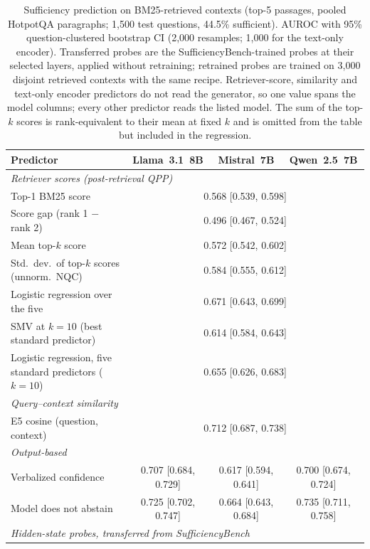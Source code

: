 \documentclass[acmsmall,screen,review]{acmart}
\newcommand{\bench}{SufficiencyBench}
\begin{document}
\begin{table}[t]
\caption{Sufficiency prediction on BM25-retrieved contexts (top-5 passages, pooled HotpotQA paragraphs; 1,500 test questions, 44.5\% sufficient). AUROC with 95\% question-clustered bootstrap CI (2,000 resamples; 1,000 for the text-only encoder). Transferred probes are the \bench{}-trained probes at their selected layers, applied without retraining; retrained probes are trained on 3,000 disjoint retrieved contexts with the same recipe. Retriever-score, similarity and text-only encoder predictors do not read the generator, so one value spans the model columns; every other predictor reads the listed model. The sum of the top-$k$ scores is rank-equivalent to their mean at fixed $k$ and is omitted from the table but included in the regression.}
\label{tab:retrieved}
\footnotesize
\setlength{\tabcolsep}{4pt}
\begin{tabular}{lccc}
\toprule
Predictor & Llama~3.1~8B & Mistral~7B & Qwen~2.5~7B \\
\midrule
\multicolumn{4}{l}{\emph{Retriever scores (post-retrieval QPP)}} \\
Top-1 BM25 score & \multicolumn{3}{c}{0.568 [0.539, 0.598]} \\
Score gap (rank 1 $-$ rank 2) & \multicolumn{3}{c}{0.496 [0.467, 0.524]} \\
Mean top-$k$ score & \multicolumn{3}{c}{0.572 [0.542, 0.602]} \\
Std.\ dev.\ of top-$k$ scores (unnorm.\ NQC) & \multicolumn{3}{c}{0.584 [0.555, 0.612]} \\
Logistic regression over the five & \multicolumn{3}{c}{0.671 [0.643, 0.699]} \\
SMV at $k = 10$ (best standard predictor) & \multicolumn{3}{c}{0.614 [0.584, 0.643]} \\
Logistic regression, five standard predictors ($k = 10$) & \multicolumn{3}{c}{0.655 [0.626, 0.683]} \\
\multicolumn{4}{l}{\emph{Query--context similarity}} \\
E5 cosine (question, context) & \multicolumn{3}{c}{0.712 [0.687, 0.738]} \\
\multicolumn{4}{l}{\emph{Output-based}} \\
Verbalized confidence & 0.707 [0.684, 0.729] & 0.617 [0.594, 0.641] & 0.700 [0.674, 0.724] \\
Model does not abstain & 0.725 [0.702, 0.747] & 0.664 [0.643, 0.684] & 0.735 [0.711, 0.758] \\
\multicolumn{4}{l}{\emph{Hidden-state probes, transferred from \bench{}}} \\

\end{tabular}
\end{table}
\end{document}
